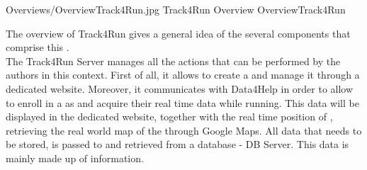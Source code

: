 \documentclass[../../DD.tex]{subfiles}
\begin{document}
	\image {13cm} {Overviews/OverviewTrack4Run.jpg} {Track4Run Overview} {OverviewTrack4Run}

	The overview of Track4Run gives a general idea of the several components that comprise this .\\
	The Track4Run Server manages all the actions that can be performed by the authors in this context. First of all, it allows  to create a  and manage it through a dedicated website. Moreover, it communicates with Data4Help in order to allow  to enroll in a  as  and acquire their real time data while running. This data will be displayed in the dedicated  website, together with the real time position of , retrieving the real world map of the  through Google Maps. All data that needs to be stored, is passed to and retrieved from a database - DB Server. This data is mainly made up of  information.

	

	
\end{document}
